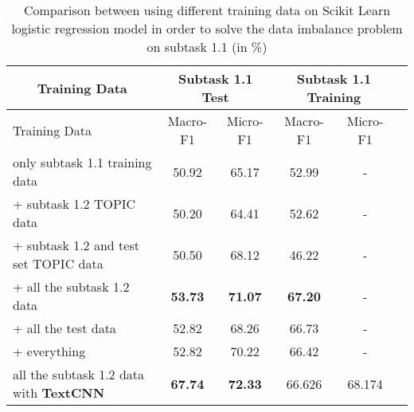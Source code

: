 \begin{table}[htbp!] %
    \centering
    \begin{tabular}{lccccc}
    \toprule
        \multicolumn{1}{c}{Training Data}              & \multicolumn{2}{c}{Subtask 1.1 Test}  & \multicolumn{2}{c}{Subtask 1.1 Training} \\
    \midrule
        Training Data                                  & Macro-F1         & Micro-F1           & Macro-F1         & Micro-F1       \\
    \midrule
        only subtask 1.1 training data                 & 50.92            & 65.17              & 52.99            & -              \\
        + subtask 1.2 TOPIC data                       & 50.20            & 64.41              & 52.62            & -              \\
        + subtask 1.2 and test set TOPIC data          & 50.50            & 68.12              & 46.22            & -              \\
        + all the subtask 1.2 data                     & \bf53.73         & \bf71.07           & \bf67.20         & -              \\
        + all the test data                            & 52.82            & 68.26              & 66.73            & -              \\
        + everything                                   & 52.82            & 70.22              & 66.42            & -              \\
        all the subtask 1.2 data with \textbf{TextCNN} & \bf67.74         & \bf72.33           & 66.626           & 68.174         \\
    \bottomrule
    \end{tabular}
\caption{Comparison between using different training data on Scikit Learn logistic regression model in order to solve the data imbalance problem on subtask 1.1 (in \%)}
\label{tab:data_imbalance}
\end{table}
